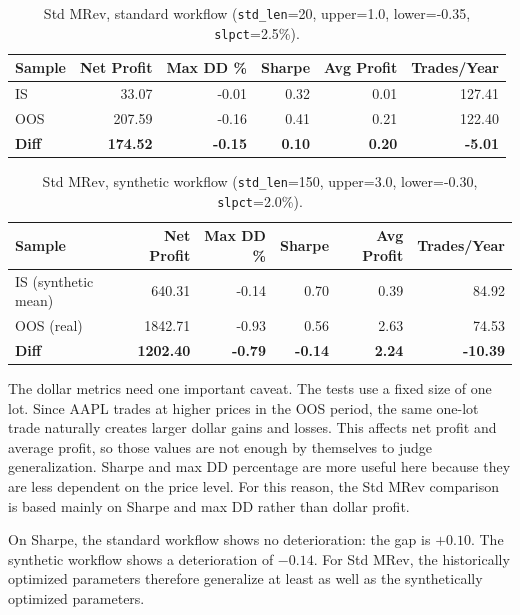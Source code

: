 \begin{table}[H]
    \centering
    \begin{tabular}{lrrrrr}
        \toprule
        Sample & Net Profit & Max DD \% & Sharpe & Avg Profit & Trades/Year \\
        \midrule
        IS   & 33.07  & -0.01 & 0.32 & 0.01 & 127.41 \\
        OOS  & 207.59 & -0.16 & 0.41 & 0.21 & 122.40 \\
        \textbf{Diff} & \textbf{174.52} & \textbf{-0.15} & \textbf{0.10} & \textbf{0.20} & \textbf{-5.01} \\
        \bottomrule
    \end{tabular}
    \caption{Std MRev, standard workflow (\texttt{std\_len}=20, upper=1.0, lower=-0.35, \texttt{slpct}=2.5\%).}
    \label{tab:mrev-standard}
\end{table}

\begin{table}[H]
    \centering
    \begin{tabular}{lrrrrr}
        \toprule
        Sample & Net Profit & Max DD \% & Sharpe & Avg Profit & Trades/Year \\
        \midrule
        IS (synthetic mean) & 640.31  & -0.14 & 0.70  & 0.39 & 84.92 \\
        OOS (real)           & 1842.71 & -0.93 & 0.56  & 2.63 & 74.53 \\
        \textbf{Diff}          & \textbf{1202.40} & \textbf{-0.79} & \textbf{-0.14} & \textbf{2.24} & \textbf{-10.39} \\
        \bottomrule
    \end{tabular}
    \caption{Std MRev, synthetic workflow (\texttt{std\_len}=150, upper=3.0, lower=-0.30, \texttt{slpct}=2.0\%).}
    \label{tab:mrev-synthetic}
\end{table}

The dollar metrics need one important caveat. The tests use a fixed size of one lot. Since AAPL trades
at higher prices in the OOS period, the same one-lot trade naturally creates larger dollar gains and
losses. This affects net profit and average profit, so those values are not enough by themselves to
judge generalization. Sharpe and max DD percentage are more useful here because they are less
dependent on the price level. For this reason, the Std MRev comparison is based mainly on Sharpe and
max DD rather than dollar profit.

On Sharpe, the standard workflow shows no deterioration: the gap is \(+0.10\). The synthetic workflow
shows a deterioration of \(-0.14\). For Std MRev, the historically optimized parameters therefore
generalize at least as well as the synthetically optimized parameters.

